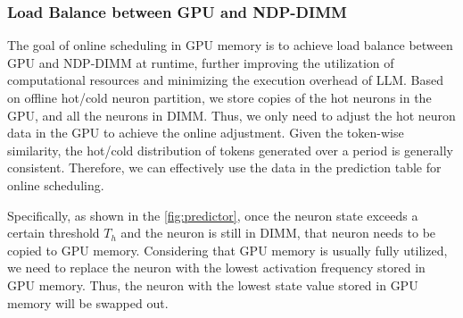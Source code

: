 

\subsubsection{Load Balance between GPU and NDP-DIMM}
The goal of online scheduling in GPU memory is to achieve load balance between GPU and NDP-DIMM at runtime, further improving the utilization of computational resources and minimizing the execution overhead of LLM.
Based on offline hot/cold neuron partition, we store copies of the hot neurons in the GPU, and all the neurons in DIMM. Thus, we only need to adjust the hot neuron data in the GPU to achieve the online adjustment.
Given the token-wise similarity, the hot/cold distribution of tokens generated over a period is generally consistent. Therefore, we can effectively use the data in the prediction table for online scheduling.

Specifically, as shown in the \fig \ref{fig:predictor}, once the neuron state exceeds a certain threshold $T_h$ and the neuron is still in DIMM, that neuron needs to be copied to GPU memory.
Considering that GPU memory is usually fully utilized, we need to replace the neuron with the lowest activation frequency stored in GPU memory. Thus, the neuron with the lowest state value stored in GPU memory will be swapped out.

